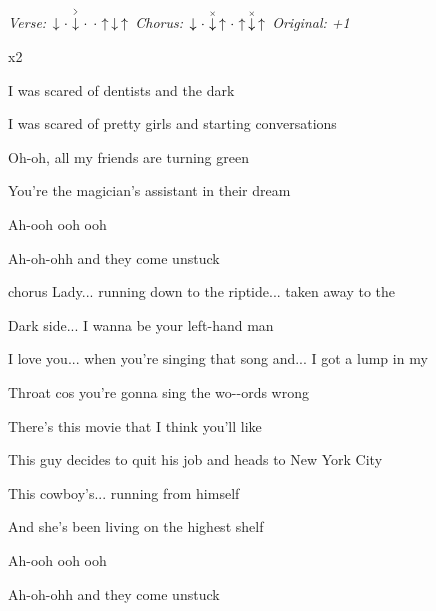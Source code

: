 \begin{song}


 \quad
\textit{Verse:} $\Down\Miss\AccentDown\Miss\Miss\Up\Down\Up$ \quad
\textit{Chorus:} $\Down\Miss\ChuckDown\Up\Miss\Up\ChuckDown\Up$ \quad
\textit{Original: +1}

\large


\large

\bigskip

     x2

\bigskip

I was scared of dentists and the dark \par
{}I was scared of pretty girls and starting conversations \par
Oh-oh, all my friends are turning green \par
You're the magician's assistant in their dream \par
Ah-ooh ooh ooh \par
Ah-oh-ohh  and they come unstuck \par

\bigskip

\begin{chorusbox}{chorus}
Lady... running down to the riptide... taken away to the \par
{}Dark side... I wanna be your left-hand man \par
I love you... when you're singing that song and... I got a lump in my \par
{}Throat cos you're gonna sing the wo--ords wrong \par
\end{chorusbox}

\bigskip

There's this movie that I think you'll like \par
This  guy decides to quit his job and heads to New York City \par
This cowboy's... running from himself \par
And she's been living on the highest shelf \par
Ah-ooh ooh ooh \par
Ah-oh-ohh  and they come unstuck \par


\end{song}
